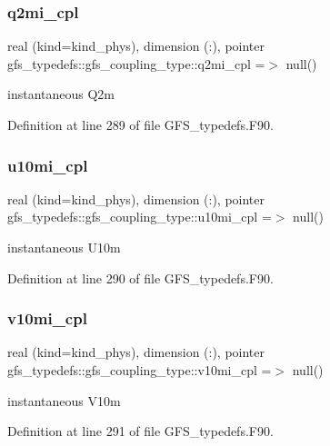 \subsubsection{q2mi\+\_\+cpl}
{\footnotesize\ttfamily real (kind=kind\+\_\+phys), dimension   (\+:), pointer gfs\+\_\+typedefs\+::gfs\+\_\+coupling\+\_\+type\+::q2mi\+\_\+cpl =$>$ null()}



instantaneous Q2m 



Definition at line 289 of file G\+F\+S\+\_\+typedefs.\+F90.

\mbox{\label{structgfs__typedefs_1_1gfs__coupling__type_a64213a7bb648c1970b46629415010a05}} 
\subsubsection{u10mi\+\_\+cpl}
{\footnotesize\ttfamily real (kind=kind\+\_\+phys), dimension  (\+:), pointer gfs\+\_\+typedefs\+::gfs\+\_\+coupling\+\_\+type\+::u10mi\+\_\+cpl =$>$ null()}



instantaneous U10m 



Definition at line 290 of file G\+F\+S\+\_\+typedefs.\+F90.

\mbox{\label{structgfs__typedefs_1_1gfs__coupling__type_ab0610e5850c5c2a77e1412c6ac431edd}} 
\subsubsection{v10mi\+\_\+cpl}
{\footnotesize\ttfamily real (kind=kind\+\_\+phys), dimension  (\+:), pointer gfs\+\_\+typedefs\+::gfs\+\_\+coupling\+\_\+type\+::v10mi\+\_\+cpl =$>$ null()}



instantaneous V10m 



Definition at line 291 of file G\+F\+S\+\_\+typedefs.\+F90.

